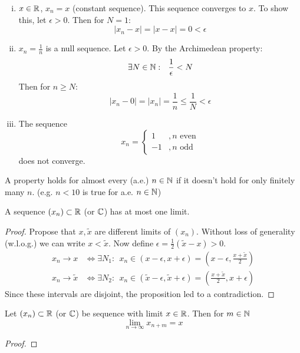\documentclass[../../script.tex]{subfiles}
\begin{document}
\begin{eg}\leavevmode
\begin{enumerate}[(i)]
	\item $x \in \mathbb{R}$, $x_n = x$ (constant sequence). This sequence converges to $x$. To show this, let $\epsilon > 0$. Then for $N = 1$:
	\[
		|x_n - x| = |x - x| = 0 < \epsilon
	\]
	
	\item $x_n = \frac{1}{n}$ is a null sequence. Let $\epsilon > 0$. By the Archimedean property:
	\[
		\exists N \in \mathbb{N}: ~~\frac{1}{\epsilon} < N
	\]
	Then for $n \ge N$:
	\[
		|x_n - 0| = |x_n| = \frac{1}{n} \le \frac{1}{N} < \epsilon
	\]
	
	\item The sequence
	\[
		x_n =
		\begin{cases}
			1 &, n \text{ even} \\
			-1 &, n \text{ odd}
		\end{cases}
	\]
	does not converge.
\end{enumerate}
\end{eg}

\begin{rem}
A property holds for almost every (a.e.) $n \in \mathbb{N}$ if it doesn't hold for only finitely many $n$. (e.g. $n < 10$ is true for a.e. $n \in \mathbb{N}$)
\end{rem}

\begin{thm}
A sequence $(x_n) \subset \mathbb{R}$ (or $\mathbb{C}$) has at most one limit.
\end{thm}
\begin{proof}
Propose that $x, \tilde{x}$ are different limits of $(x_n)$. Without loss of generality (w.l.o.g.) we can write $x < \tilde{x}$. Now define $\epsilon = \frac{1}{2}(\tilde{x} - x) > 0$.
\begin{align}
	x_n \longrightarrow x &\iff \exists N_1: ~~x_n \in (x - \epsilon, x + \epsilon) = \left(x - \epsilon, \frac{x + \tilde{x}}{2}\right) \\
	x_n \longrightarrow \tilde{x} &\iff \exists N_2: ~~x_n \in (\tilde{x} - \epsilon, \tilde{x} + \epsilon) = \left(\frac{x + \tilde{x}}{2}, x + \epsilon\right)
\end{align}
Since these intervals are disjoint, the proposition led to a contradiction.
\end{proof}

\begin{thm}
Let $(x_n) \subset \mathbb{R}$ (or $\mathbb{C}$) be sequence with limit $x \in \mathbb{R}$. Then for $m \in \mathbb{N}$
\[
	\lim_{n \rightarrow \infty} x_{n+m} = x
\]
\end{thm}
\begin{proof}
\reader
\end{proof}
\end{document}
